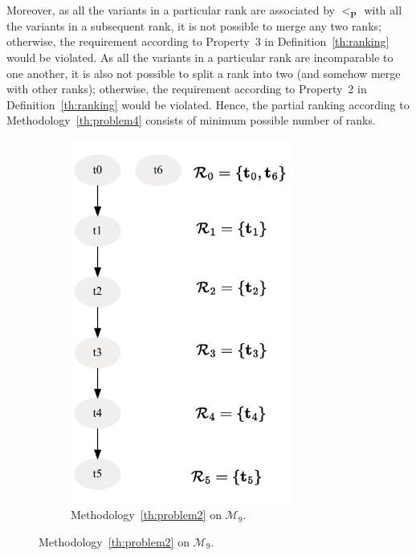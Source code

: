 \documentclass[acmsmall,screen, review]{acmart}
\begin{document}
Moreover, as all the variants in a particular rank are associated by $<_{\mathbf{P}}$ with all the variants in a subsequent rank, it is not possible to merge any two ranks; otherwise, the requirement according to Property~3 in Definition~\ref{th:ranking} would be violated. As all the variants in a particular rank are incomparable to one another, it is also not possible to split a rank into two (and somehow merge with other ranks); otherwise, the requirement according to Property~2 in Definition~\ref{th:ranking} would be violated. Hence, the partial ranking according to  Methodology~\ref{th:problem4} consists of minimum possible number of ranks. 
\begin{figure}[h!]
	\centering
	\begin{subfigure}{0.35\textwidth}
		\centering
		\includegraphics[width=0.8\textwidth]{fig/ch3/minrank-eg3-dfg}
		\caption{Methodology~\ref{th:problem2} on $\mathcal{M}_{9}$.}
		\label{fig3:minrank-eg3-dfg}
	\end{subfigure}
	

\end{figure}
\end{document}
